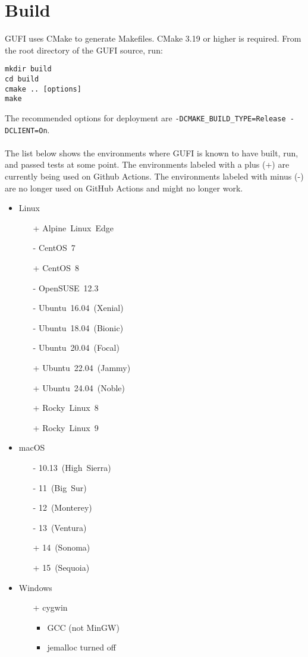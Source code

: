\section{Build}

GUFI uses CMake to generate Makefiles. CMake 3.19 or higher is
required. From the root directory of the GUFI source, run:
\begin{verbatim}
mkdir build
cd build
cmake .. [options]
make
\end{verbatim}

The recommended options for deployment are
\texttt{-DCMAKE\_BUILD\_TYPE=Release -DCLIENT=On}.
\\\\
The list below shows the environments where GUFI is known to have
built, run, and passed tests at some point. The environments labeled
with a plus (+) are currently being used on Github Actions. The
environments labeled with minus (-) are no longer used on GitHub
Actions and might no longer work.
\begin{itemize}
\item Linux
  \begin{itemize}
  \item[+] Alpine~Linux~Edge
  \item[-] CentOS~7
  \item[+] CentOS~8
  \item[-] OpenSUSE~12.3
  \item[-] Ubuntu~16.04~(Xenial)
  \item[-] Ubuntu~18.04~(Bionic)
  \item[-] Ubuntu~20.04~(Focal)
  \item[+] Ubuntu~22.04~(Jammy)
  \item[+] Ubuntu~24.04~(Noble)
  \item[+] Rocky~Linux~8
  \item[+] Rocky~Linux~9
  \end{itemize}
\item macOS
  \begin{itemize}
  \item[-] 10.13~(High~Sierra)
  \item[-] 11~(Big~Sur)
  \item[-] 12~(Monterey)
  \item[-] 13~(Ventura)
  \item[+] 14~(Sonoma)
  \item[+] 15~(Sequoia)
  \end{itemize}
\item Windows
  \begin{itemize}
  \item[+] cygwin
    \begin{itemize}
    \item GCC (not MinGW)
    \item jemalloc turned off
    \end{itemize}
  \end{itemize}
\end{itemize}


